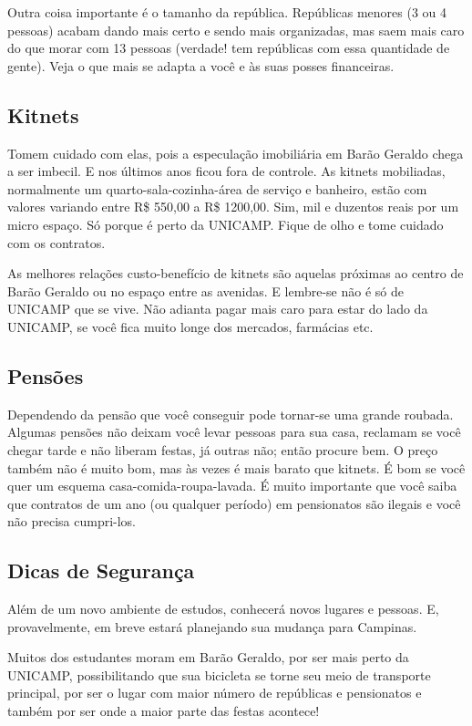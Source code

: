 Outra coisa importante é o tamanho da república. Repúblicas menores (3 ou
4 pessoas) acabam dando mais certo e sendo mais organizadas, mas saem mais caro
do que morar com 13 pessoas (verdade! tem repúblicas com essa quantidade de
gente). Veja o que mais se adapta a você e às suas posses financeiras.

\subsection{Kitnets}
Tomem cuidado com elas, pois a especulação imobiliária em Barão Geraldo chega
a ser imbecil. E nos últimos anos ficou fora de controle. As kitnets mobiliadas,
normalmente um quarto-sala-cozinha-área de serviço e banheiro, estão com valores
variando entre R\$ 550,00 a R\$ 1200,00. Sim, mil e duzentos reais por um micro
espaço. Só porque é perto da UNICAMP. Fique de olho e tome cuidado com os
contratos.

As melhores relações custo-benefício de kitnets são aquelas próximas ao centro
de Barão Geraldo ou no espaço entre as avenidas. E lembre-se não é só de UNICAMP
que se vive. Não adianta pagar mais caro para estar do lado da UNICAMP, se você
fica muito longe dos mercados, farmácias etc.

\subsection{Pensões}
Dependendo da pensão que você conseguir pode tornar-se uma grande roubada.
Algumas pensões não deixam você levar pessoas para sua casa, reclamam se você
chegar tarde e não liberam festas, já outras não; então procure bem. O preço
também não é muito bom, mas às vezes é mais barato que kitnets. É bom se você
quer um esquema casa-comida-roupa-lavada. É muito importante que você saiba que
contratos de um ano (ou qualquer período) em pensionatos são ilegais e você não
precisa cumpri-los.

\subsection{Dicas de Segurança}
Além de um novo ambiente de estudos, conhecerá novos lugares e pessoas. E,
provavelmente, em breve estará planejando sua mudança para Campinas.

Muitos dos estudantes moram em Barão Geraldo, por ser mais perto da UNICAMP,
possibilitando que sua bicicleta se torne seu meio de transporte principal, por
ser o lugar com maior número de repúblicas e pensionatos e também por ser onde
a maior parte das festas acontece!

